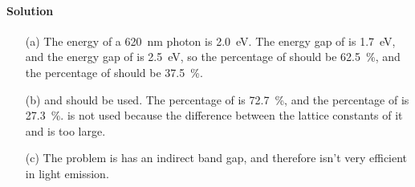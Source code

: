 \documentclass[hyperref, a4paper]{article}
\begin{document}
\paragraph{Solution} \begin{itemize}
\item[(a)] The energy of a \SI{620}{nm} photon is \SI{2.0}{eV}.
The energy gap of  is \SI{1.7}{eV},
and the energy gap of  is \SI{2.5}{eV},
so the percentage of  should be \SI{62.5}{\percent},
and the percentage of  should be \SI{37.5}{\percent}.

\item[(b)]  and  should be used.
The percentage of  is \SI{72.7}{\percent}, 
and the percentage of  is \SI{27.3}{\percent}.
 is not used because the difference between the lattice constants of it and  is too large.

\item[(c)] The problem is  has an indirect band gap, 
and therefore isn't very efficient in light emission.
\end{itemize}
\end{document}
